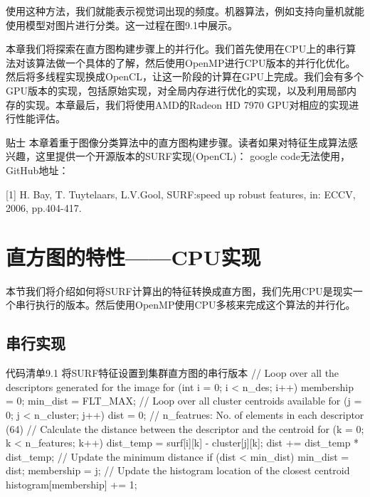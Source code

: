 使用这种方法，我们就能表示视觉词出现的频度。机器算法，例如支持向量机就能使用模型对图片进行分类。这一过程在图9.1中展示。

本章我们将探索在直方图构建步骤上的并行化。我们首先使用在CPU上的串行算法对该算法做一个具体的了解，然后使用OpenMP进行CPU版本的并行化优化。然后将多线程实现换成OpenCL，让这一阶段的计算在GPU上完成。我们会有多个GPU版本的实现，包括原始实现，对全局内存进行优化的实现，以及利用局部内存的实现。本章最后，我们将使用AMD的Radeon HD 7970 GPU对相应的实现进行性能评估。

\begin{myNotic}{贴士}
本章着重于图像分类算法中的直方图构建步骤。读者如果对特征生成算法感兴趣，这里提供一个开源版本的SURF实现(OpenCL)： google code无法使用，GitHub地址：
\end{myNotic}

\myRefRule

\begin{myRefs}

[1] H. Bay, T. Tuytelaars, L.V.Gool, SURF:speed up robust features, in: ECCV, 2006, pp.404-417.

\end{myRefs}



\section{直方图的特性——CPU实现}

本节我们将介绍如何将SURF计算出的特征转换成直方图，我们先用CPU是现实一个串行执行的版本。然后使用OpenMP使用CPU多核来完成这个算法的并行化。

\subsection{串行实现}

\begin{codeboxt}[cpp]{代码清单9.1 将SURF特征设置到集群直方图的串行版本}
// Loop over all the descriptors generated for the image
for (int i = 0; i < n_des; i++){
  membership = 0;
  min_dist = FLT_MAX;
  // Loop over all cluster centroids available
  for (j = 0; j < n_cluster; j++){
    dist = 0;
    // n_featrues: No. of elements in each descriptor (64)
    // Calculate the distance between the descriptor and the centroid
    for (k = 0; k < n_features; k++){
      dist_temp = surf[i][k] - cluster[j][k];
      dist += dist_temp * dist_temp;
    }
    // Update the minimum distance
    if (dist < min_dist){
      min_dist = dist;
      membership = j;
    }
  }
  // Update the histogram location of the closest centroid
  histogram[membership] += 1;
}
\end{codeboxt}

